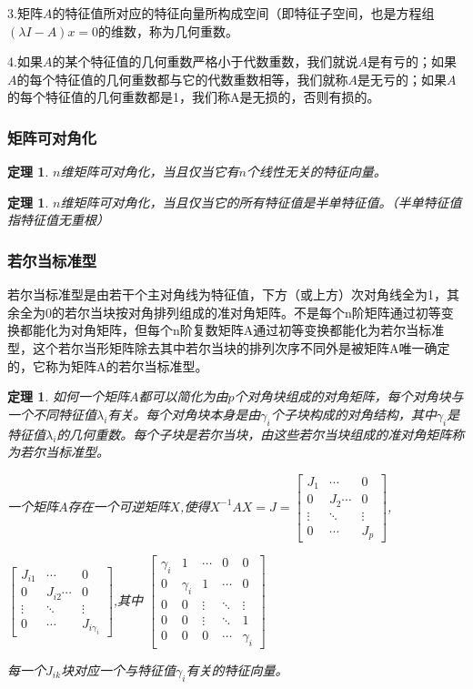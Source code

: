 \documentclass{article}
\begin{document}
3.矩阵$A$的特征值所对应的特征向量所构成空间（即特征子空间，也是方程组$(λI-A)x=0$的维数，称为几何重数。

4.如果$A$的某个特征值的几何重数严格小于代数重数，我们就说$A$是有亏的；如果$A$的每个特征值的几何重数都与它的代数重数相等，我们就称$A$是无亏的；如果$A$的每个特征值的几何重数都是1，我们称A是无损的，否则有损的。
\subsubsection{矩阵可对角化}
\newtheorem{thm}{定理}
\begin{thm}
$n$维矩阵可对角化，当且仅当它有$n$个线性无关的特征向量。
\end{thm}

\newtheorem{thm}{定理}
\begin{thm}
$n$维矩阵可对角化，当且仅当它的所有特征值是半单特征值。（半单特征值指特征值无重根）
\end{thm}

\subsubsection{若尔当标准型}
\begin{definition}
若尔当标准型是由若干个主对角线为特征值，下方（或上方）次对角线全为1，其余全为0的若尔当块按对角排列组成的准对角矩阵。不是每个n阶矩阵通过初等变换都能化为对角矩阵，但每个n阶复数矩阵A通过初等变换都能化为若尔当标准型，这个若尔当形矩阵除去其中若尔当块的排列次序不同外是被矩阵A唯一确定的，它称为矩阵A的若尔当标准型。
\end{definition}

\newtheorem{thm}{定理}
\begin{thm}
如何一个矩阵$A$都可以简化为由$p$个对角块组成的对角矩阵，每个对角块与一个不同特征值$\lambda _i$有关。每个对角块本身是由$\gamma _i$个子块构成的对角结构，其中$\gamma _i$是特征值$\lambda _i$的几何重数。每个子块是若尔当块，由这些若尔当块组成的准对角矩阵称为若尔当标准型。

一个矩阵$A$存在一个可逆矩阵$X$,使得$X^{-1}AX=J=\begin{bmatrix}
J_1 &\cdots & 0\\
0 &J_2\cdots & 0\\
\vdots & \ddots & \vdots\\
0 & \cdots & J_p
\end{bmatrix}$,

$\begin{bmatrix}
J_{i1} &\cdots & 0\\
0 &J_{i2}\cdots & 0\\
\vdots & \ddots & \vdots\\
0 & \cdots & J_{i\gamma _i}
\end{bmatrix}$,其中
$\begin{bmatrix}
\gamma _i &1&\cdots & 0&0\\
0 &\gamma _i&1&\cdots & 0\\
0&0&\vdots & \ddots & \vdots\\
0&0&\vdots & \ddots &1\\
0 &0&0& \cdots & \gamma _i
\end{bmatrix}$

每一个$J_{ik}$块对应一个与特征值$\gamma _i$有关的特征向量。
\end{thm}
\end{document}
